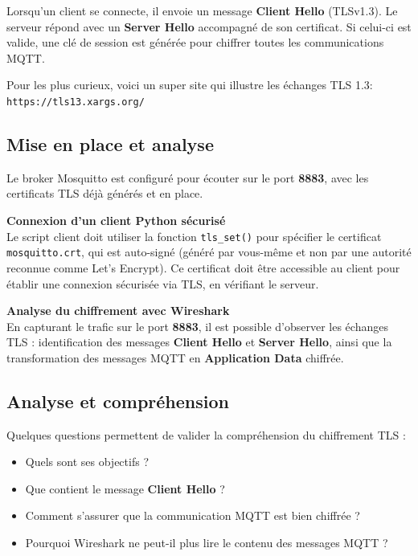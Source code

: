 \documentclass{article}
\begin{document}
Lorsqu'un client se connecte, il envoie un message \textbf{Client Hello} (TLSv1.3). Le serveur répond avec un \textbf{Server Hello} accompagné de son certificat. Si celui-ci est valide, une clé de session est générée pour chiffrer toutes les communications MQTT.

Pour les plus curieux, voici un super site qui illustre les échanges TLS 1.3: \texttt{https://tls13.xargs.org/}

\subsection{Mise en place et analyse}

Le broker Mosquitto est configuré pour écouter sur le port \textbf{8883}, avec les certificats TLS déjà générés et en place.

\bigskip
\noindent
\textbf{Connexion d'un client Python sécurisé} \\
Le script client doit utiliser la fonction \texttt{tls\_set()} pour spécifier le certificat \texttt{mosquitto.crt}, qui est auto-signé (généré par vous-même et non par une autorité reconnue comme Let's Encrypt). Ce certificat doit être accessible au client pour établir une connexion sécurisée via TLS, en vérifiant le serveur.

\bigskip
\noindent
\textbf{Analyse du chiffrement avec Wireshark} \\
En capturant le trafic sur le port \textbf{8883}, il est possible d'observer les échanges TLS : identification des messages \textbf{Client Hello} et \textbf{Server Hello}, ainsi que la transformation des messages MQTT en \textbf{Application Data} chiffrée.

\subsection{Analyse et compréhension}

Quelques questions permettent de valider la compréhension du chiffrement TLS : \begin{itemize} \item Quels sont ses objectifs ? \item Que contient le message \textbf{Client Hello} ? \item Comment s’assurer que la communication MQTT est bien chiffrée ? \item Pourquoi Wireshark ne peut-il plus lire le contenu des messages MQTT ? \end{itemize}
\end{document}

